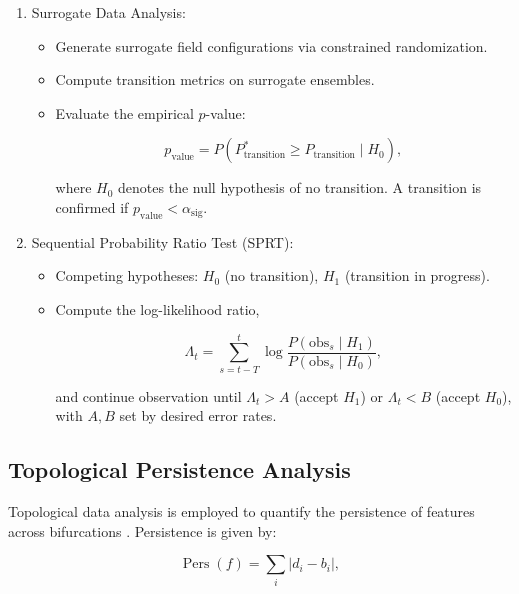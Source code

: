 \begin{enumerate}
    \item Surrogate Data Analysis:
    \begin{itemize}
        \item Generate surrogate field configurations via constrained randomization.
        \item Compute transition metrics on surrogate ensembles.
        \item Evaluate the empirical \(p\)-value:

        \begin{equation}
        p_{\text{value}} = P(P^*_{\text{transition}} \geq P_{\text{transition}} \mid H_0),
        \end{equation}

        where \(H_0\) denotes the null hypothesis of no transition. A transition is confirmed if \(p_{\text{value}} < \alpha_{\text{sig}}\).
    \end{itemize}
    \item Sequential Probability Ratio Test (SPRT):
    \begin{itemize}
        \item Competing hypotheses: \(H_0\) (no transition), \(H_1\) (transition in progress).
        \item Compute the log-likelihood ratio,

        \begin{equation}
        \Lambda_t = \sum_{s=t-T}^{t} \log\frac{P(\text{obs}_s \mid H_1)}{P(\text{obs}_s \mid H_0)},
        \end{equation}

        and continue observation until \(\Lambda_t > A\) (accept \(H_1\)) or \(\Lambda_t < B\) (accept \(H_0\)), with \(A, B\) set by desired error rates.
    \end{itemize}
\end{enumerate}

\subsection{Topological Persistence Analysis}

Topological data analysis is employed to quantify the persistence of features across bifurcations \autocite{EdelsbrunnerHarer2010}. Persistence is given by:

\begin{equation}
\operatorname{Pers}(f) = \sum_{i} |d_i - b_i|,
\end{equation}

